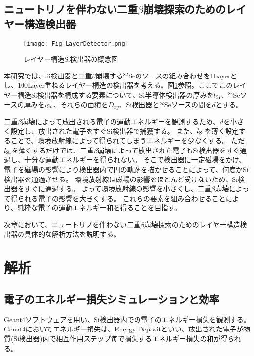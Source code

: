\documentclass[a4paper,10pt]{jreport}
\begin{document}
\section{ニュートリノを伴わない二重$\beta$崩壊探索のためのレイヤー構造検出器}

\begin{figure}[H]
	\center
	\texttt{[image: Fig-LayerDetector.png]}
	\caption{レイヤー構造Si検出器の概念図} \label{Fig-LayerDetector}
\end{figure}

本研究では、Si検出器と二重$\beta$崩壊する$^{82}$Seのソースの組み合わせを1Layerとし、100Layer重ねるレイヤー構造の検出器を考える。図\ref{Fig-LayerDetector}参照。ここでこのレイヤー構造Si検出器を構成する要素について、Si半導体検出器の厚みを$l_{\rm{Si}}$、$^{82}$Seソースの厚みを$l_{\rm{Se}}$、それらの面積を$D_{xy}$、Si検出器と$^{82}$Seソースの間を$d$とする。

二重$\beta$崩壊によって放出される電子の運動エネルギーを観測するため、$d$を小さく設定し、放出された電子をすぐSi検出器で捕獲する。
また、$l_{\rm{Si}}$を薄く設定することで、環境放射線によって得られてしまうエネルギーを少なくする。
ただ$l_{\rm{Si}}$を薄くするだけでは、二重$\beta$崩壊によって放出された電子もSi検出器をすぐ通過し、十分な運動エネルギーを得られない。
そこで検出器に一定磁場をかけ、電子を磁場の影響により検出器内で円の軌跡を描かせることによって、何度かSi検出器を通過させる。
環境放射線は磁場の影響をほとんど受けないため、Si検出器をすぐに通過する。
よって環境放射線の影響を小さくし、二重$\beta$崩壊によって得られる電子の影響を大きくする。
これらの要素を組み合わせることにより、純粋な電子の運動エネルギー和を得ることを目指す。

次章において、ニュートリノを伴わない二重$\beta$崩壊探索のためのレイヤー構造検出器の具体的な解析方法を説明する。



\chapter{解析}



\section{電子のエネルギー損失シミュレーションと効率}

Geant4ソフトウェアを用い、Si検出器内での電子のエネルギー損失を観測する。
Genat4においてエネルギー損失は、Energy Depositといい、放出された電子が物質(Si検出器)内で相互作用ステップ毎で損失するエネルギー損失の和が得られる。
\end{document}
